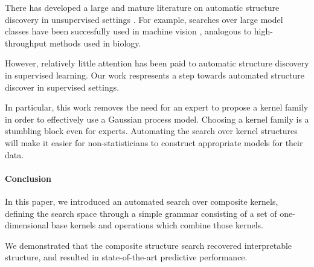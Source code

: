 \documentclass[twoside]{article}
\begin{document}
{\begin{quotation}
\hspace*{\fill}\citet{Jaynes85highlyinformative}


\end{quotation}

There has developed a large and mature literature on automatic structure discovery in unsupervised settings .  
For example, searches over large model classes have been succesfully used in machine vision \cite{pinto2009high}, analogous to high-throughput methods used in biology.

However, relatively little attention has been paid to automatic structure discovery in supervised learning. %
%
Our work respresents a step towards automated structure discover in supervised settings.

In particular, this work removes the need for an expert to propose a kernel family in order to effectively use a Gaussian process model.  
Choosing a kernel family is a stumbling block even for experts.
Automating the search over kernel structures will make it easier for non-statisticians to construct appropriate models for their data.









\paragraph{Conclusion}

In this paper, we introduced an automated search over composite kernels, defining the search space through a simple grammar consisting of a set of one-dimensional base kernels and operations which combine those kernels.

We demonstrated that the composite structure search recovered interpretable structure, and resulted in state-of-the-art predictive performance.  %

}
\end{document}
